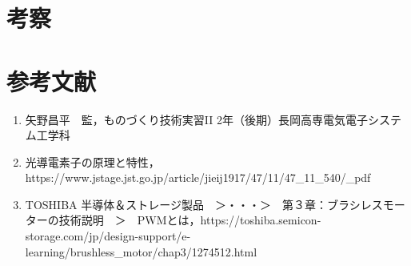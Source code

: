 \documentclass {ujarticle}
\begin{document}
 \section{考察}
 
 \section{参考文献}
 \begin{enumerate}
 \item 矢野昌平　監，ものづくり技術実習II 2年（後期）長岡高専電気電子システム工学科 
 \item 光導電素子の原理と特性，https://www.jstage.jst.go.jp/article/jieij1917/47/11/47\_11\_540/\_pdf
 \item TOSHIBA 半導体＆ストレージ製品　＞・・・＞　第３章：ブラシレスモーターの技術説明　＞　PWMとは，https://toshiba.semicon-storage.com/jp/design-support/e-learning/brushless\_motor/chap3/1274512.html 
  \end{enumerate}
 
 
 
 
 
 
 
 
 
 
 
 
 
 
 
 
 
 
 
 
 
 
 
\end{document}
